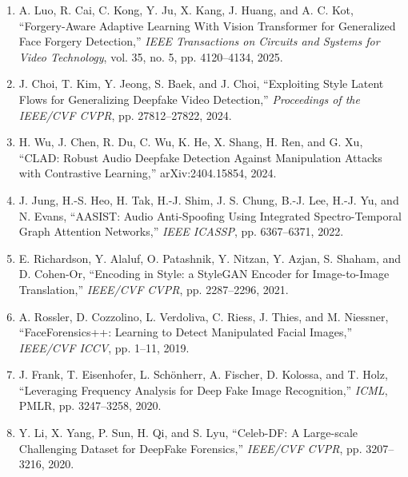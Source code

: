 \documentclass[12pt,a4paper]{report}
\begin{document}
\begin{enumerate}[label=\arabic*.,leftmargin=*]
    \item A. Luo, R. Cai, C. Kong, Y. Ju, X. Kang, J. Huang, and A. C. Kot, ``Forgery-Aware Adaptive Learning With Vision Transformer for Generalized Face Forgery Detection,'' \textit{IEEE Transactions on Circuits and Systems for Video Technology}, vol. 35, no. 5, pp. 4120--4134, 2025.
    \item J. Choi, T. Kim, Y. Jeong, S. Baek, and J. Choi, ``Exploiting Style Latent Flows for Generalizing Deepfake Video Detection,'' \textit{Proceedings of the IEEE/CVF CVPR}, pp. 27812--27822, 2024.
    \item H. Wu, J. Chen, R. Du, C. Wu, K. He, X. Shang, H. Ren, and G. Xu, ``CLAD: Robust Audio Deepfake Detection Against Manipulation Attacks with Contrastive Learning,'' arXiv:2404.15854, 2024.
    \item J. Jung, H.-S. Heo, H. Tak, H.-J. Shim, J. S. Chung, B.-J. Lee, H.-J. Yu, and N. Evans, ``AASIST: Audio Anti-Spoofing Using Integrated Spectro-Temporal Graph Attention Networks,'' \textit{IEEE ICASSP}, pp. 6367--6371, 2022.
    \item E. Richardson, Y. Alaluf, O. Patashnik, Y. Nitzan, Y. Azjan, S. Shaham, and D. Cohen-Or, ``Encoding in Style: a StyleGAN Encoder for Image-to-Image Translation,'' \textit{IEEE/CVF CVPR}, pp. 2287--2296, 2021.
    \item A. Rossler, D. Cozzolino, L. Verdoliva, C. Riess, J. Thies, and M. Niessner, ``FaceForensics++: Learning to Detect Manipulated Facial Images,'' \textit{IEEE/CVF ICCV}, pp. 1--11, 2019.
    \item J. Frank, T. Eisenhofer, L. Schönherr, A. Fischer, D. Kolossa, and T. Holz, ``Leveraging Frequency Analysis for Deep Fake Image Recognition,'' \textit{ICML}, PMLR, pp. 3247--3258, 2020.
    \item Y. Li, X. Yang, P. Sun, H. Qi, and S. Lyu, ``Celeb-DF: A Large-scale Challenging Dataset for DeepFake Forensics,'' \textit{IEEE/CVF CVPR}, pp. 3207--3216, 2020.
\end{enumerate}
\end{document}
